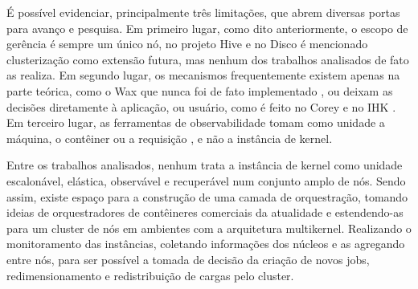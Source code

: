 É possível evidenciar, principalmente três limitações, que abrem diversas portas para avanço e pesquisa.
Em primeiro lugar, como dito anteriormente, o escopo de gerência é sempre um único nó, no projeto Hive e no Disco é
mencionado clusterização como extensão futura, mas nenhum dos trabalhos analisados de fato as realiza.
Em segundo lugar, os mecanismos frequentemente existem apenas na parte teórica, como o Wax que nunca foi de fato implementado \citep{chapin1995hive},
ou deixam as decisões diretamente à aplicação, ou usuário, como é feito no Corey e no IHK \citep{boydwickizer2008corey,shimosawa2014ihk}.
Em terceiro lugar, as ferramentas de observabilidade tomam como unidade a máquina, o contêiner ou a requisição
\citep{massie2004ganglia,agelastos2014ldms}, e não a instância de kernel.

Entre os trabalhos analisados, nenhum trata a instância de kernel como unidade escalonável, elástica, observável e
recuperável num conjunto amplo de nós.
Sendo assim, existe espaço para a construção de uma camada de orquestração, tomando ideias
de orquestradores de contêineres comerciais da atualidade e estendendo-as para um cluster de nós em ambientes
com a arquitetura multikernel.
Realizando o monitoramento das instâncias, coletando informações dos núcleos e as agregando entre nós, para ser
possível a tomada de decisão da criação de novos jobs, redimensionamento e redistribuição de cargas pelo cluster.
